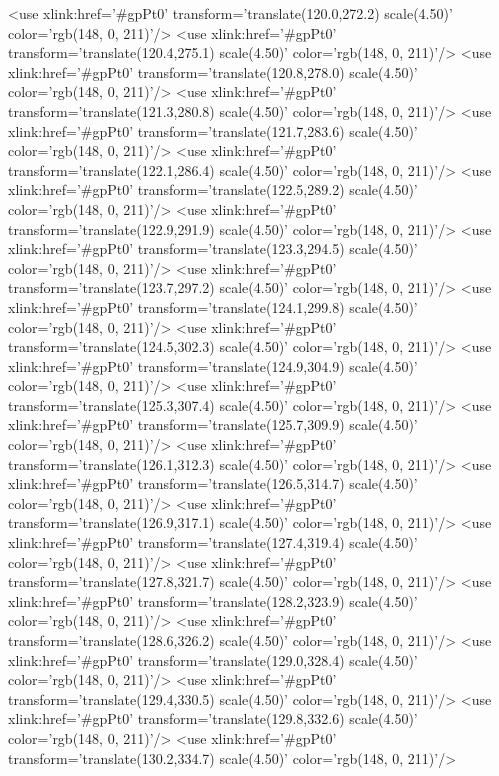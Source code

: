 	<use xlink:href='#gpPt0' transform='translate(120.0,272.2) scale(4.50)' color='rgb(148,   0, 211)'/>
	<use xlink:href='#gpPt0' transform='translate(120.4,275.1) scale(4.50)' color='rgb(148,   0, 211)'/>
	<use xlink:href='#gpPt0' transform='translate(120.8,278.0) scale(4.50)' color='rgb(148,   0, 211)'/>
	<use xlink:href='#gpPt0' transform='translate(121.3,280.8) scale(4.50)' color='rgb(148,   0, 211)'/>
	<use xlink:href='#gpPt0' transform='translate(121.7,283.6) scale(4.50)' color='rgb(148,   0, 211)'/>
	<use xlink:href='#gpPt0' transform='translate(122.1,286.4) scale(4.50)' color='rgb(148,   0, 211)'/>
	<use xlink:href='#gpPt0' transform='translate(122.5,289.2) scale(4.50)' color='rgb(148,   0, 211)'/>
	<use xlink:href='#gpPt0' transform='translate(122.9,291.9) scale(4.50)' color='rgb(148,   0, 211)'/>
	<use xlink:href='#gpPt0' transform='translate(123.3,294.5) scale(4.50)' color='rgb(148,   0, 211)'/>
	<use xlink:href='#gpPt0' transform='translate(123.7,297.2) scale(4.50)' color='rgb(148,   0, 211)'/>
	<use xlink:href='#gpPt0' transform='translate(124.1,299.8) scale(4.50)' color='rgb(148,   0, 211)'/>
	<use xlink:href='#gpPt0' transform='translate(124.5,302.3) scale(4.50)' color='rgb(148,   0, 211)'/>
	<use xlink:href='#gpPt0' transform='translate(124.9,304.9) scale(4.50)' color='rgb(148,   0, 211)'/>
	<use xlink:href='#gpPt0' transform='translate(125.3,307.4) scale(4.50)' color='rgb(148,   0, 211)'/>
	<use xlink:href='#gpPt0' transform='translate(125.7,309.9) scale(4.50)' color='rgb(148,   0, 211)'/>
	<use xlink:href='#gpPt0' transform='translate(126.1,312.3) scale(4.50)' color='rgb(148,   0, 211)'/>
	<use xlink:href='#gpPt0' transform='translate(126.5,314.7) scale(4.50)' color='rgb(148,   0, 211)'/>
	<use xlink:href='#gpPt0' transform='translate(126.9,317.1) scale(4.50)' color='rgb(148,   0, 211)'/>
	<use xlink:href='#gpPt0' transform='translate(127.4,319.4) scale(4.50)' color='rgb(148,   0, 211)'/>
	<use xlink:href='#gpPt0' transform='translate(127.8,321.7) scale(4.50)' color='rgb(148,   0, 211)'/>
	<use xlink:href='#gpPt0' transform='translate(128.2,323.9) scale(4.50)' color='rgb(148,   0, 211)'/>
	<use xlink:href='#gpPt0' transform='translate(128.6,326.2) scale(4.50)' color='rgb(148,   0, 211)'/>
	<use xlink:href='#gpPt0' transform='translate(129.0,328.4) scale(4.50)' color='rgb(148,   0, 211)'/>
	<use xlink:href='#gpPt0' transform='translate(129.4,330.5) scale(4.50)' color='rgb(148,   0, 211)'/>
	<use xlink:href='#gpPt0' transform='translate(129.8,332.6) scale(4.50)' color='rgb(148,   0, 211)'/>
	<use xlink:href='#gpPt0' transform='translate(130.2,334.7) scale(4.50)' color='rgb(148,   0, 211)'/>
